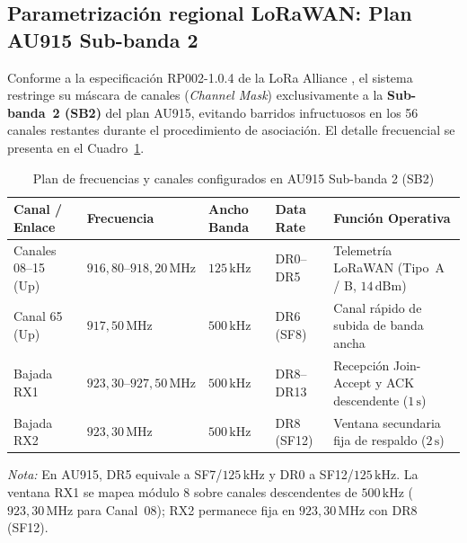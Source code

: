 \documentclass[12pt,oneside,openany,spanish,oldfontcommands]{memoir}
\renewcommand{\arraystretch}{1.15}
\begin{document}
\subsection{Parametrización regional LoRaWAN: Plan AU915 Sub-banda 2}

Conforme a la especificación RP002-1.0.4 de la LoRa Alliance \parencite{lorawan_rp002}, el sistema
restringe su máscara de canales (\textit{Channel Mask}) exclusivamente a la \textbf{Sub-banda~2
(SB2)} del plan AU915, evitando barridos infructuosos en los 56 canales restantes durante el
procedimiento de asociación. El detalle frecuencial se presenta en el
Cuadro~\ref{tab:frecuencias-au915-diseno}.

\begin{table}[H]
\centering
\footnotesize
\setlength{\tabcolsep}{3pt}
\renewcommand{\arraystretch}{1.05}
\caption{Plan de frecuencias y canales configurados en AU915 Sub-banda 2 (SB2)}\label{tab:frecuencias-au915-diseno}
\begin{tabularx}{\textwidth}{
  >{\raggedright\arraybackslash}p{2.3cm}
  >{\centering\arraybackslash}p{3.2cm}
  >{\centering\arraybackslash}p{1.4cm}
  >{\centering\arraybackslash}p{1.5cm}
  >{\raggedright\arraybackslash}X
}
\toprule
\textbf{Canal / Enlace} & \textbf{Frecuencia} & \textbf{Ancho Banda} & \textbf{Data Rate} & \textbf{Función Operativa} \\
\midrule
Canales 08--15 (Up) & $916,80\text{--}918,20\,\text{MHz}$ & $125\,\text{kHz}$ & DR0--DR5 & Telemetría LoRaWAN (Tipo~A / B, $14\,\text{dBm}$) \\
Canal 65 (Up)       & $917,50\,\text{MHz}$               & $500\,\text{kHz}$ & DR6 (SF8) & Canal rápido de subida de banda ancha \\
Bajada RX1          & $923,30\text{--}927,50\,\text{MHz}$ & $500\,\text{kHz}$ & DR8--DR13 & Recepción Join-Accept y ACK descendente ($1\,\text{s}$) \\
Bajada RX2          & $923,30\,\text{MHz}$               & $500\,\text{kHz}$ & DR8 (SF12) & Ventana secundaria fija de respaldo ($2\,\text{s}$) \\
\bottomrule
\end{tabularx}
\vspace{0.08cm}
\scriptsize
\textit{Nota:} En AU915, DR5 equivale a SF7/$125\,\text{kHz}$ y DR0 a SF12/$125\,\text{kHz}$. La ventana RX1 se mapea módulo 8 sobre canales descendentes de $500\,\text{kHz}$ ($923,30\,\text{MHz}$ para Canal~08); RX2 permanece fija en $923,30\,\text{MHz}$ con DR8 (SF12).
\end{table}
\end{document}
